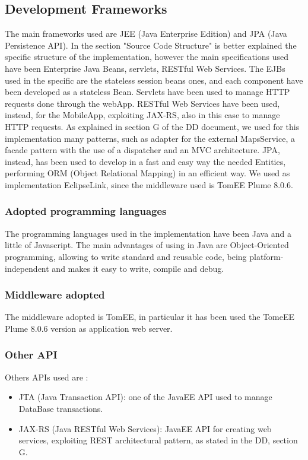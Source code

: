 \renewcommand{\thesubsection}{\Alph{subsection}}
\subsection{Development Frameworks}
The main frameworks used are JEE (Java Enterprise Edition) and JPA (Java Persistence API). In the section "Source Code Structure" is better explained the specific structure of the implementation, however the main specifications used have been Enterprise Java Beans, servlets, RESTful Web Services. The EJBs used in the specific are the stateless session beans ones, and each component have been developed as a stateless Bean. 
Servlets have been used to manage HTTP requests done through the webApp. RESTful Web Services have been used, instead, for the MobileApp, exploiting JAX-RS, also in this case to manage HTTP requests.
As explained in section G of the DD document, we used for this implementation many patterns, such as adapter for the external MapsService, a facade pattern with the use of a dispatcher and an MVC architecture.
JPA, instead, has been used to develop in a fast and easy way the needed Entities, performing ORM (Object Relational Mapping) in an efficient way.
We used as implementation EclipseLink, since the middleware used is TomEE Plume 8.0.6.

\subsubsection{Adopted programming languages}
The programming languages used in the implementation have been Java and a little of Javascript.
The main advantages of using in Java are Object-Oriented programming, allowing to write standard and reusable code, being platform-independent and makes it easy to write, compile and debug.
\subsubsection{Middleware adopted}
The middleware adopted is TomEE, in particular it has been used the TomeEE Plume 8.0.6 version as application web server.
\subsubsection{Other API}
Others APIs used are :
\begin {itemize}
	\item JTA (Java Transaction API):  one of the JavaEE API used to manage DataBase transactions.
	\item JAX-RS (Java RESTful Web Services): JavaEE API for creating web services, exploiting REST architectural pattern, as stated in the DD, section G.
\end{itemize}

